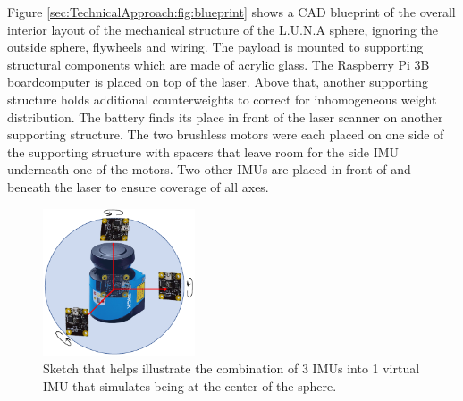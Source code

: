 Figure \ref{sec:TechnicalApproach:fig:blueprint} shows a CAD blueprint of the overall interior layout of the mechanical structure of the L.U.N.A sphere, ignoring the outside sphere, flywheels and wiring.
The payload is mounted to supporting structural components which are made of acrylic glass.
The Raspberry Pi 3B boardcomputer is placed on top of the laser.
Above that, another supporting structure holds additional counterweights to correct for inhomogeneous weight distribution.                                                                                                     
The battery finds its place in front of the laser scanner on another supporting structure.
The two brushless motors were each placed on one side of the supporting structure with spacers that leave room for the side IMU underneath one of the motors.
Two other IMUs are placed in front of and beneath the laser to ensure coverage of all axes.                                                                                 

\begin{figure}                                                                                                                                                                                                    
\centering
\includegraphics[width=0.4\textwidth]{../Media/virtualIMU.png}                                                                                                                                                      
\caption{Sketch that helps illustrate the combination of 3 IMUs into 1 virtual IMU that simulates being at the center of the sphere.}                                                                                                                           
\label{sec:SensorIntegration:fig:virtual}                                                                                                                                                                       
\end{figure}                                                                                                                                                                                                      

